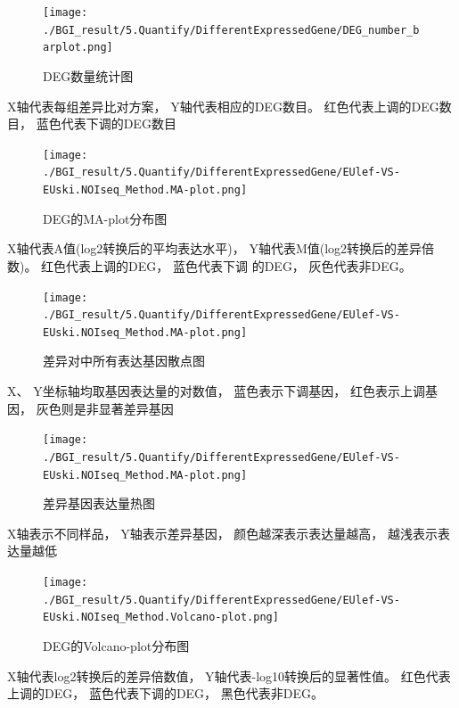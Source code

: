 \documentclass[10pt, oneside,a4paper]{article}
\begin{document}
\begin{figure}[H]
\centering
\texttt{[image: ./BGI\_result/5.Quantify/DifferentExpressedGene/DEG\_number\_barplot.png]}
\par
\renewcommand{\figurename}{图}
\caption{DEG数量统计图}
\label{degstat}
\end{figure}
\begin{center}
X轴代表每组差异比对方案， Y轴代表相应的DEG数目。 红色代表上调的DEG数目， 蓝色代表下调的DEG数目
\end{center}

\begin{figure}[H]
\centering
\texttt{[image: ./BGI\_result/5.Quantify/DifferentExpressedGene/EUlef-VS-EUski.NOIseq\_Method.MA-plot.png]}
\par
\renewcommand{\figurename}{图}
\caption{DEG的MA-plot分布图}
\label{ma}
\end{figure}
\begin{center}
X轴代表A值(log2转换后的平均表达水平)， Y轴代表M值(log2转换后的差异倍数)。 红色代表上调的DEG， 蓝色代表下调
的DEG， 灰色代表非DEG。
\end{center}

\begin{figure}[H]
\centering
\texttt{[image: ./BGI\_result/5.Quantify/DifferentExpressedGene/EUlef-VS-EUski.NOIseq\_Method.MA-plot.png]}
\par
\renewcommand{\figurename}{图}
\caption{差异对中所有表达基因散点图}
\label{sca}
\end{figure}
\begin{center}
X、 Y坐标轴均取基因表达量的对数值， 蓝色表示下调基因， 红色表示上调基因， 灰色则是非显著差异基因
\end{center}

\begin{figure}[H]
\centering
\texttt{[image: ./BGI\_result/5.Quantify/DifferentExpressedGene/EUlef-VS-EUski.NOIseq\_Method.MA-plot.png]}
\par
\renewcommand{\figurename}{图}
\caption{差异基因表达量热图}
\label{heatmap}
\end{figure}
\begin{center}
X轴表示不同样品， Y轴表示差异基因， 颜色越深表示表达量越高， 越浅表示表达量越低
\end{center}

\begin{figure}[H]
\centering
\texttt{[image: ./BGI\_result/5.Quantify/DifferentExpressedGene/EUlef-VS-EUski.NOIseq\_Method.Volcano-plot.png]}
\par
\renewcommand{\figurename}{图}
\caption{DEG的Volcano-plot分布图}
\label{vol}
\end{figure}
\begin{center}
X轴代表log2转换后的差异倍数值， Y轴代表-log10转换后的显著性值。 红色代表上调的DEG， 蓝色代表下调的DEG，
黑色代表非DEG。
\end{center}
\end{document}
